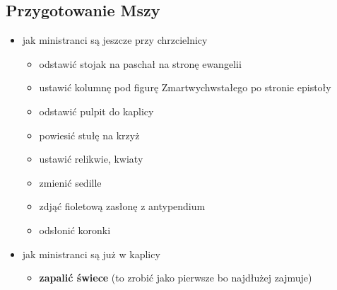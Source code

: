 \subsection{Przygotowanie Mszy}
\begin{itemize}
	\item jak ministranci są jeszcze przy chrzcielnicy
	      \begin{itemize}
		      \item odstawić stojak na paschał na stronę ewangelii
		      \item ustawić kolumnę pod figurę Zmartwychwstałego po stronie
		            epistoły
		      \item odstawić pulpit do kaplicy
		      \item powiesić stułę na krzyż
		      \item ustawić relikwie, kwiaty
		      \item zmienić sedille
		      \item zdjąć {\color{violet} fioletową} zasłonę z antypendium
		      \item odsłonić koronki
	      \end{itemize}
	\item jak ministranci są już w kaplicy
	      \begin{itemize}
		      \item \textbf{zapalić świece} (to zrobić jako pierwsze bo
		            najdłużej zajmuje)
	      \end{itemize}
\end{itemize}

